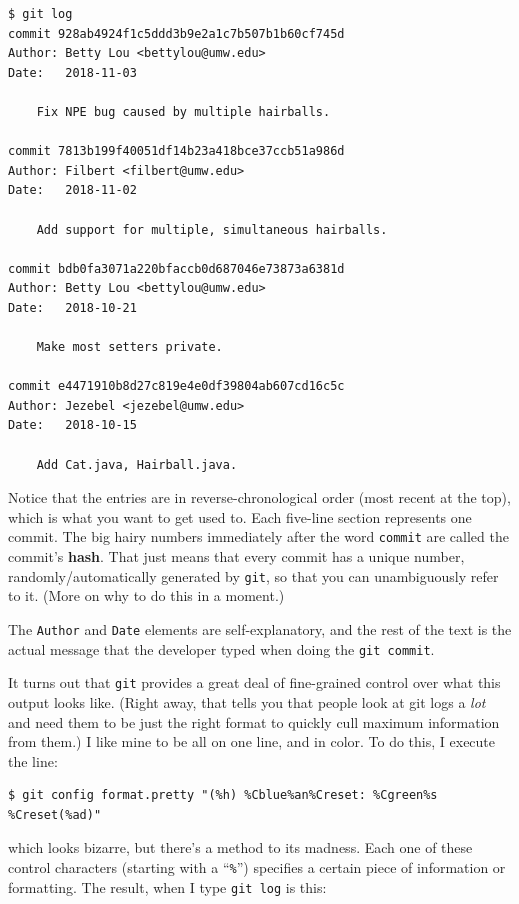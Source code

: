\begin{Verbatim}[fontsize=\footnotesize,samepage=true,frame=single]
$ git log
commit 928ab4924f1c5ddd3b9e2a1c7b507b1b60cf745d
Author: Betty Lou <bettylou@umw.edu>
Date:   2018-11-03

    Fix NPE bug caused by multiple hairballs.

commit 7813b199f40051df14b23a418bce37ccb51a986d
Author: Filbert <filbert@umw.edu>
Date:   2018-11-02

    Add support for multiple, simultaneous hairballs.

commit bdb0fa3071a220bfaccb0d687046e73873a6381d
Author: Betty Lou <bettylou@umw.edu>
Date:   2018-10-21

    Make most setters private.

commit e4471910b8d27c819e4e0df39804ab607cd16c5c
Author: Jezebel <jezebel@umw.edu>
Date:   2018-10-15

    Add Cat.java, Hairball.java.
\end{Verbatim}

Notice that the entries are in reverse-chronological order (most recent at the
top), which is what you want to get used to. Each five-line section represents
one commit. The big hairy numbers immediately after the word \texttt{commit}
are called the commit's \textbf{hash}. That just means that every commit has a
unique number, randomly/automatically generated by \texttt{git}, so that you
can unambiguously refer to it. (More on why to do this in a moment.)

The \texttt{Author} and \texttt{Date} elements are self-explanatory, and the
rest of the text is the actual message that the developer typed when doing the
\texttt{git commit}.

It turns out that \texttt{git} provides a great deal of fine-grained control
over what this output looks like. (Right away, that tells you that people look
at git logs a \textit{lot} and need them to be just the right format to
quickly cull maximum information from them.) I like mine to be all on one
line, and in color. To do this, I execute the line:

\begin{Verbatim}[fontsize=\scriptsize,samepage=true,frame=none]
$ git config format.pretty "(%h) %Cblue%an%Creset: %Cgreen%s %Creset(%ad)"
\end{Verbatim}

which looks bizarre, but there's a method to its madness. Each one of these
control characters (starting with a ``\texttt{\%}'') specifies a certain piece
of information or formatting. The result, when I type \texttt{git log} is
this:

